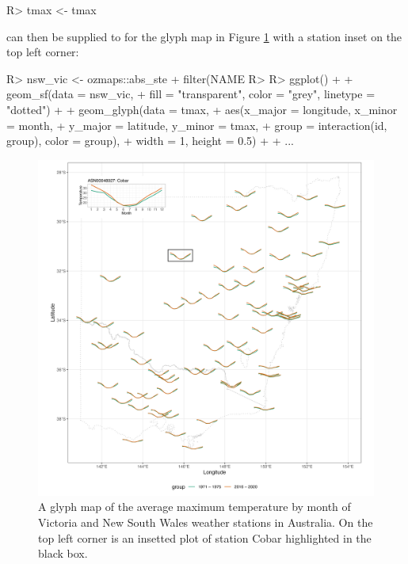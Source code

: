 \documentclass[
]{jss}
\begin{document}
\begin{CodeChunk}
\begin{CodeInput}
R> tmax <- tmax %
\end{CodeInput}
\end{CodeChunk}

 can then be supplied to  for the glyph
map in Figure \ref{fig:basic-manip} with a station inset on the top left
corner:

\begin{CodeChunk}
\begin{CodeInput}
R> nsw_vic <- ozmaps::abs_ste %
+   filter(NAME %
R> 
R> ggplot() + 
+   geom_sf(data = nsw_vic, 
+           fill = "transparent", color = "grey", linetype = "dotted") + 
+   geom_glyph(data = tmax, 
+              aes(x_major = longitude, x_minor = month, 
+                  y_major = latitude, y_minor = tmax,
+                  group = interaction(id, group), color = group),
+              width = 1, height = 0.5) +
+   ...
\end{CodeInput}
\end{CodeChunk}

\begin{CodeChunk}
\begin{figure}

{\centering \includegraphics[width=1\linewidth,height=0.7\textheight]{figures/basic-manip} 

}

\caption[A glyph map of the average maximum temperature by month of Victoria and New South Wales weather stations in Australia]{A glyph map of the average maximum temperature by month of Victoria and New South Wales weather stations in Australia. On the top left corner is an insetted plot of station Cobar highlighted in the black box.}\label{fig:basic-manip}
\end{figure}
\end{CodeChunk}
\end{document}
